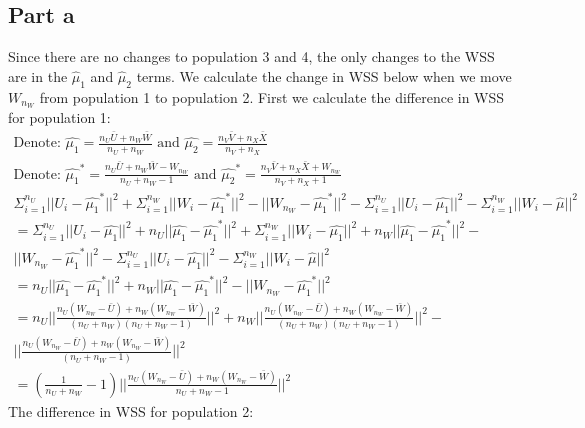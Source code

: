 \documentclass{article}\usepackage[]{graphicx}\usepackage[]{color}
\begin{document}
\subsection*{Part a}
Since there are no changes to population 3 and 4, the only changes to the WSS are in the $\hat{\mu}_1$ and $\hat{\mu}_2$ terms.  We calculate the change in WSS below when we move $W_{n_W}$ from population 1 to population 2.  First we calculate the difference in WSS for population 1:
\begin{align*}
\text{Denote: } \hat{\mu_1} = \frac{n_U \bar{U} + n_W \bar{W}}{n_U + n_W} \text{ and } \hat{\mu_2} = \frac{n_V \bar{V} + n_X \bar{X}}{n_V + n_X}\\
\text{Denote: } \hat{\mu_1}^* = \frac{n_U \bar{U} + n_W \bar{W} - W_{n_W}}{n_U + n_W - 1}  \text{ and } \hat{\mu_2}^* = \frac{n_V \bar{V} + n_X \bar{X} + W_{n_W}}{n_V + n_X + 1}\\
\Sigma_{i=1}^{n_U}||U_i - \hat{\mu_1}^*||^2 + \Sigma_{i=1}^{n_W}||W_i - \hat{\mu_1}^*||^2 - ||W_{n_W} - \hat{\mu_1}^*||^2 - \Sigma_{i=1}^{n_U}||U_i - \hat{\mu_1}||^2 - \Sigma_{i=1}^{n_W}||W_i - \hat{\mu}||^2\\
=\Sigma_{i=1}^{n_U}||U_i - \hat{\mu_1}||^2 + n_U||\hat{\mu_1} - \hat{\mu_1}^*||^2 + \Sigma_{i=1}^{n_W}||W_i - \hat{\mu_1}||^2 + n_W||\hat{\mu_1} - \hat{\mu_1}^*||^2 - \\
||W_{n_W} - \hat{\mu_1}^*||^2 - \Sigma_{i=1}^{n_U}||U_i - \hat{\mu_1}||^2 - \Sigma_{i=1}^{n_W}||W_i - \hat{\mu}||^2\\
=n_U||\hat{\mu_1} - \hat{\mu_1}^*||^2 + n_W||\hat{\mu_1} - \hat{\mu_1}^*||^2 - ||W_{n_W} - \hat{\mu_1}^*||^2\\
= n_U||\frac{n_U(W_{n_W} - \bar{U}) + n_W(W_{n_W} - \bar{W})}{(n_U + n_W)(n_U + n_W - 1)}||^2 + n_W||\frac{n_U(W_{n_W} - \bar{U}) + n_W(W_{n_W} - \bar{W})}{(n_U + n_W)(n_U + n_W - 1)}||^2 - \\
||\frac{n_U(W_{n_W} - \bar{U}) + n_W(W_{n_W} - \bar{W})}{(n_U + n_W - 1)}||^2 \\
= (\frac{1}{n_U + n_W} - 1)||\frac{n_U(W_{n_W} - \bar{U}) + n_W(W_{n_W} - \bar{W})}{n_U + n_W - 1}||^2
\end{align*}
The difference in WSS for population 2:
\end{document}
